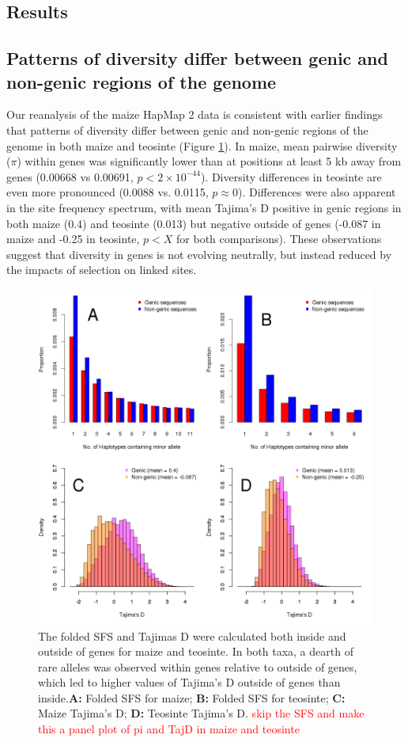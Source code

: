 \documentclass{pnastwo}
\newcommand{\jri}[1]{\textcolor{red}{\scriptsize #1}}
\begin{document}
\begin{article}
\section{Results}
\subsection{Patterns of diversity differ between genic and
  non-genic regions of the genome}
Our reanalysis of the maize HapMap 2 data \cite{chia2012} is consistent with earlier findings that patterns of diversity differ between genic and non-genic regions of the genome in both maize and teosinte \cite{hufford2012} (Figure \ref{fig:diversity}). 
In maize, mean pairwise diversity ($\pi$) within genes was significantly lower than at positions at least 5 kb away from genes (0.00668 vs 0.00691, $p<2\times 10^{-44}$). 
Diversity differences in teosinte are even more pronounced (0.0088 vs. 0.0115, $p\approx 0$). 
Differences were also apparent in the site frequency spectrum, with mean Tajima's D positive in genic regions in both maize (0.4) and teosinte (0.013) but negative outside of genes (-0.087 in maize and -0.25 in teosinte, $p<X$ for both comparisons).
These observations suggest that diversity in genes is not evolving neutrally, but instead reduced by the impacts of selection on linked sites. 

\begin{figure}
\centering
\includegraphics[width=.5\textwidth]{FigsAndFiles/SFS_and_Tajima.png}
\caption{The folded SFS and Tajimas D were calculated both inside and outside of genes for maize and teosinte. In both taxa, a dearth of rare alleles was observed within genes relative to outside of genes, which led to higher values of Tajima's D outside of genes than inside.{\bf A:} Folded SFS for maize; {\bf B:} Folded SFS for teosinte; {\bf C:} Maize Tajima's D; {\bf D:} Teosinte Tajima's D.  \label{fig:diversity} \jri{skip the SFS and make this a panel plot of pi and TajD in maize and teosinte} } 
\end{figure}


\end{article}
\end{document}
